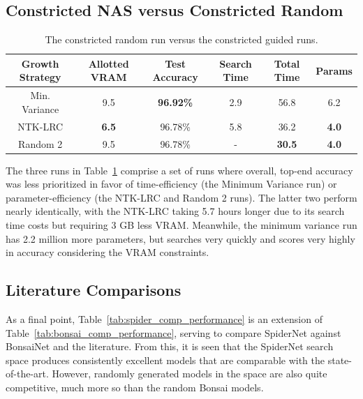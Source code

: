 \subsection{Constricted NAS versus Constricted Random}
\begin{table}[ht!]
\begin{center}
\begin{tabular}{c|c|c|c|c|c}
    Growth Strategy & Allotted VRAM & Test Accuracy    & Search Time  & Total Time & Params \\
    \hline
    Min. Variance   & 9.5      & \textbf{96.92\%} & 2.9          & 56.8             & 6.2    \\
    NTK-LRC         & \textbf{6.5}      & 96.78\%          & 5.8          & 36.2             & \textbf{4.0} \\
    Random 2        & 9.5      & 96.78\%          & -            & \textbf{30.5}    & \textbf{4.0}   \\
\end{tabular}
\end{center}
\caption[The constricted random run versus the constricted guided runs]{The constricted random run versus the constricted guided runs.}
\label{tab:spider_constrict}
\end{table}
The three runs in Table~\ref{tab:spider_constrict} comprise a set of runs where overall, top-end accuracy was less prioritized in favor of
time-efficiency (the Minimum Variance run) or parameter-efficiency (the NTK-LRC and Random 2 runs). The
latter two perform nearly identically, with the NTK-LRC taking 5.7 hours longer due to its search time
costs but requiring 3 GB less VRAM. Meanwhile, the minimum variance run has 2.2 million more parameters, but
searches very quickly and scores very highly in accuracy considering the VRAM constraints.

\subsection{Literature Comparisons}
As a final point, Table~\ref{tab:spider_comp_performance} is an extension of Table~\ref{tab:bonsai_comp_performance},
serving to compare SpiderNet against BonsaiNet and the literature. From this, it is seen that the SpiderNet search space
produces consistently excellent models that are comparable with the state-of-the-art. However,
randomly generated models in the space are also quite competitive, much more so than the random Bonsai models.

